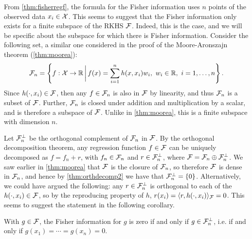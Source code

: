From \cref{thm:fisherregf}, the formula for the Fisher information uses $n$ points of the observed data $x_i\in{\mathcal X}$.
This seems to suggest that the Fisher information only exists for a finite subspace of the RKHS ${\mathcal F}$.
Indeed, this is the case, and we will be specific about the subspace for which there is Fisher information.
Consider the following set, a similar one considered in the proof of the Moore-Aronszajn theorem (\cref{thm:moorea}):
\begin{align}\label{eq:subspaceFn}
{\mathcal F}_n = \left\{ f:{\mathcal X} \to \mathbb{R} \, \bigg| \, f(x) = \sum_{i=1}^n h(x,x_i)w_i, \ w_i \in \mathbb{R}, \ i=1,\dots,n \right\}.  
\end{align}
Since $h(\cdot,x_i) \in {\mathcal F}$, then any $f \in {\mathcal F}_n$ is also in ${\mathcal F}$ by linearity, and thus ${\mathcal F}_n$ is a subset of ${\mathcal F}$.
Further, ${\mathcal F}_n$ is closed under addition and multiplication by a scalar, and is therefore a subspace of ${\mathcal F}$.
Unlike in \cref{thm:moorea}, this is a finite subspace with dimension $n$.

Let ${\mathcal F}_n^\bot$ be the orthogonal complement of ${\mathcal F}_n$ in ${\mathcal F}$.
By the orthogonal decomposition theorem, any regression function $f\in{\mathcal F}$ can be uniquely decomposed as $f = f_n + r$, with $f_n \in {\mathcal F}_n$ and $r \in {\mathcal F}_n^\bot$, where $\mathcal F = \mathcal F_n \oplus  {\mathcal F}_n^\bot$.
We saw earlier in \cref{thm:moorea} that ${\mathcal F}$ is the closure of ${\mathcal F}_n$, so therefore ${\mathcal F}$ is dense in ${\mathcal F}_n$, and hence by \cref{thm:orthdecomp2} we have that ${\mathcal F}_n^\bot = \{0\}$.
Alternatively, we could have argued the following: any $r \in {\mathcal F}_n^\bot$ is orthogonal to each of the $h(\cdot,x_i)\in{\mathcal F}$, so by the reproducing property of $h$, $r(x_i) = \langle r,h(\cdot,x_i)\rangle_{\mathcal F} = 0$.
This seems to suggest the statement in the following corollary.

\begin{corollary}
  With $g \in {\mathcal F}$, the Fisher information for $g$ is zero if and only if $g\in{\mathcal F}_n^\bot$, i.e. if and only if $g(x_1) = \cdots = g(x_n) = 0$.
\end{corollary}

